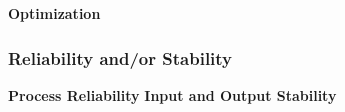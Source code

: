 \documentclass{report}
\begin{document}


\textbf{Optimization}



\subsubsection{Reliability and/or Stability}

\textbf{Process Reliability}
\textbf{Input and Output Stability}
\end{document}
